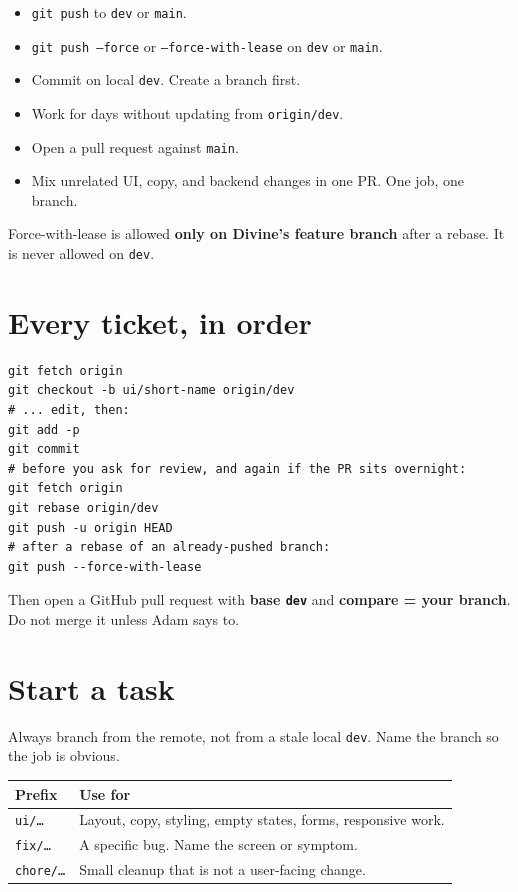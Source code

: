 \documentclass[11pt]{article}
\begin{document}
\begin{itemize}
  \item \texttt{git push} to \texttt{dev} or \texttt{main}.
  \item \texttt{git push --force} or \texttt{--force-with-lease} on \texttt{dev} or \texttt{main}.
  \item Commit on local \texttt{dev}. Create a branch first.
  \item Work for days without updating from \texttt{origin/dev}.
  \item Open a pull request against \texttt{main}.
  \item Mix unrelated UI, copy, and backend changes in one PR. One job, one branch.
\end{itemize}

Force-with-lease is allowed \textbf{only on Divine's feature branch} after a rebase. It is never allowed on \texttt{dev}.

\section{Every ticket, in order}

\begin{Verbatim}[fontsize=\small,frame=single,framesep=5pt,commandchars=\\\{\}]
git fetch origin
git checkout -b ui/short-name origin/dev
# ... edit, then:
git add -p
git commit
# before you ask for review, and again if the PR sits overnight:
git fetch origin
git rebase origin/dev
git push -u origin HEAD
# after a rebase of an already-pushed branch:
git push --force-with-lease
\end{Verbatim}

Then open a GitHub pull request with \textbf{base \texttt{dev}} and \textbf{compare = your branch}. Do not merge it unless Adam says to.

\section{Start a task}

Always branch from the remote, not from a stale local \texttt{dev}. Name the branch so the job is obvious.

\begin{center}
\renewcommand{\arraystretch}{1.15}
\begin{tabular}{@{}L{1.2in}L{5.0in}@{}}
\toprule
\textbf{Prefix} & \textbf{Use for} \\
\midrule
\texttt{ui/\ldots} & Layout, copy, styling, empty states, forms, responsive work. \\
\texttt{fix/\ldots} & A specific bug. Name the screen or symptom. \\
\texttt{chore/\ldots} & Small cleanup that is not a user-facing change. \\
\bottomrule
\end{tabular}
\end{center}
\end{document}
